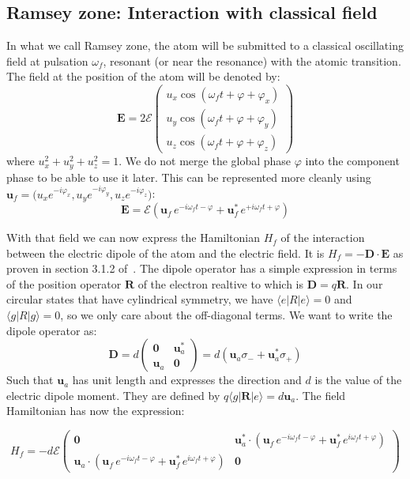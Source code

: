 \documentclass[10pt,a4paper]{report}
\theoremstyle{plain}
\theoremstyle{definition}
\theoremstyle{remark}
\newcommand{\ket}[1]{|#1\rangle}
\newcommand{\bra}[1]{\langle#1|}
\newcommand{\mat}[1]{\begin{pmatrix}#1\end{pmatrix}}
\newcommand{\bs}{\boldsymbol}
\begin{document}
\subsection{Ramsey zone: Interaction with classical field}\label{sec:ramsey}


In what we call Ramsey zone, the atom will be submitted to a classical oscillating
field at pulsation $\omega_f$, resonant (or near the resonance) with the atomic
transition. The field at the position of the atom will
be denoted by:
\[\bs E = 2\mathcal{E}
  \mat{u_x\cos(\omega_f t + \varphi + \varphi_x)\\
    u_y\cos(\omega_f t + \varphi + \varphi_y)\\
    u_z\cos(\omega_f t + \varphi + \varphi_z)}\]
where $u_x^2 + u_y^2 +u_z^2 = 1$. We do not merge the global phase $\varphi$ into
the component phase to be able to use it later. This can be represented more
cleanly using $\bs u_f = \big(u_x e^{-i\varphi_x},u_y e^{-i\varphi_y},u_z
e^{-i\varphi_z}\big)$:
\begin{equation}\label{eqn:field}
\bs E = \mathcal{E} (\bs u_f\, e^{-i\omega_f t-\varphi} + \bs u_f^*\,
  e^{+i\omega_f t + \varphi})
\end{equation}


With that field we can now express the Hamiltonian $H_f$ of the
interaction between the electric dipole of the
atom and the electric field. It is $H_f = - \bs D \cdot \bs E$ as proven in
section 3.1.2 of~\cite{Har06}.
The dipole operator has a simple expression in terms
of the position operator $\bs R$ of the electron realtive to  which is $\bs D = q \bs R$.
In our circular states that have cylindrical symmetry,
we have $\bra e R \ket e = 0$ and $\bra g R \ket g = 0$,
so we only care about the off-diagonal terms. We want to write the dipole
operator as:
\begin{equation}\label{eqn:D}
  \bs D = d\mat{\bs 0&\bs u_a^*\\\bs u_a&\bs 0} = d(\bs u_a \sigma_- + \bs u_a^* \sigma_+)
\end{equation}
Such that $\bs u_a$ has unit length and expresses the direction
and $d$ is the value of the electric dipole
moment. They are defined by $ q \bra g \bs R \ket e = d \bs u_a$. The field
Hamiltonian has now the expression:

\[ H_f = -d\mathcal{E} \mat{\bs 0 &
  \bs u_a^* \cdot (\bs u_f\, e^{-i\omega_f t-\varphi} + \bs u_f^*\,
  e^{i\omega_f t + \varphi})\\
\bs u_a \cdot (\bs u_f\, e^{-i\omega_f t-\varphi} + \bs u_f^*\,
  e^{i\omega_f t + \varphi}) & \bs 0
}\]
\end{document}
